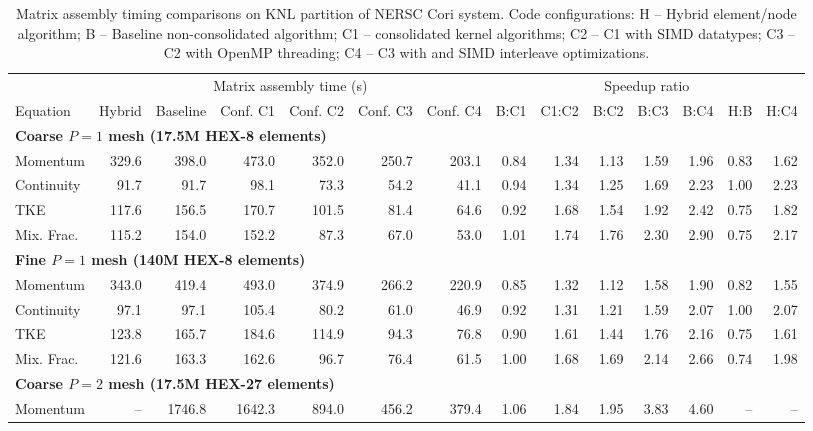 \begin{landscape}
  \begin{table}[tb]
    \centering
    \caption{Matrix assembly timing comparisons on KNL partition of NERSC Cori
      system. Code configurations: H -- Hybrid element/node algorithm; B --
      Baseline non-consolidated algorithm; C1 -- consolidated kernel algorithms; C2 --
      C1 with SIMD datatypes; C3 -- C2 with OpenMP threading; C4 -- C3 with
       and SIMD interleave optimizations.}
    \label{tab:knl_assembly_timings}
    \begin{tabular}{l|r|r|r|r|r|r|r|r|r|r|r|r|r}
      \hline\hline
      & \multicolumn{6}{c|}{Matrix assembly time (s)} & \multicolumn{7}{c}{Speedup ratio} \\[0.5em]
      Equation & Hybrid & Baseline & Conf. C1 & Conf. C2 & Conf. C3 & Conf. C4 & B:C1 & C1:C2 & B:C2 & B:C3 & B:C4  & H:B & H:C4\\ [1em]
      \multicolumn{10}{l}{\textbf{Coarse $P=1$ mesh (17.5M HEX-8 elements)}} \\
      \hline
      Momentum & 329.6 & 398.0 & 473.0 & 352.0 & 250.7 & 203.1 & 0.84 & 1.34 & 1.13 & 1.59 & 1.96 & 0.83 & 1.62\\
      Continuity & 91.7 & 91.7 & 98.1 & 73.3 & 54.2 & 41.1 & 0.94 & 1.34 & 1.25 & 1.69 & 2.23 & 1.00 & 2.23\\
      TKE & 117.6 & 156.5 & 170.7 & 101.5 & 81.4 & 64.6 & 0.92 & 1.68 & 1.54 & 1.92 & 2.42 & 0.75 & 1.82\\
      Mix. Frac. & 115.2 & 154.0 & 152.2 & 87.3 & 67.0 & 53.0 & 1.01 & 1.74 & 1.76 & 2.30 & 2.90 & 0.75 & 2.17\\ [1em]
      \multicolumn{10}{l}{\textbf{Fine $P=1$ mesh (140M HEX-8 elements)}} \\
      \hline
      Momentum & 343.0 & 419.4 & 493.0 & 374.9 & 266.2 & 220.9 & 0.85 & 1.32 & 1.12 & 1.58 & 1.90 & 0.82 & 1.55\\
      Continuity & 97.1 & 97.1 & 105.4 & 80.2 & 61.0 & 46.9 & 0.92 & 1.31 & 1.21 & 1.59 & 2.07 & 1.00 & 2.07\\
      TKE & 123.8 & 165.7 & 184.6 & 114.9 & 94.3 & 76.8 & 0.90 & 1.61 & 1.44 & 1.76 & 2.16 & 0.75 & 1.61\\
      Mix. Frac. & 121.6 & 163.3 & 162.6 & 96.7 & 76.4 & 61.5 & 1.00 & 1.68 & 1.69 & 2.14 & 2.66 & 0.74 & 1.98\\ [1em]
      \multicolumn{10}{l}{\textbf{Coarse $P=2$ mesh (17.5M HEX-27 elements)}} \\
      \hline
      Momentum & -- & 1746.8 & 1642.3 & 894.0 & 456.2 & 379.4 & 1.06 & 1.84 & 1.95 & 3.83 & 4.60 & -- & --\\

\end{tabular}
\end{table}
\end{landscape}
